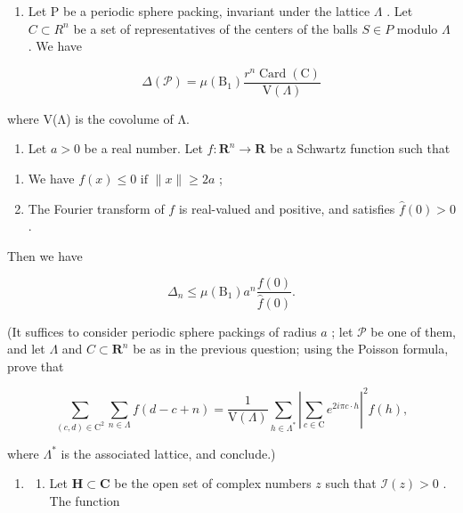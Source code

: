\begin{enumerate}
\def\labelenumi{\alph{enumi})}
\setcounter{enumi}{1}
\tightlist
\item
  Let P be a periodic sphere packing, invariant under the lattice \(\Lambda\) . Let \(C \subset R^{n}\) be a set of representatives of the centers of the balls \(S \in P\) modulo \(\Lambda\) . We have
\end{enumerate}

\[
\Delta (\mathcal {P}) = \mu (\mathrm{B} _ {1}) \frac {r ^ {n} \operatorname{Card} (\mathrm{C})}{\mathrm{V} (\Lambda)}
\]

where V(Λ) is the covolume of Λ.

\begin{enumerate}
\def\labelenumi{\alph{enumi})}
\setcounter{enumi}{2}
\tightlist
\item
  Let \(a > 0\) be a real number. Let \(f: \mathbf{R}^{n} \to \mathbf{R}\) be a Schwartz function such that
\end{enumerate}

\begin{enumerate}
\def\labelenumi{(\roman{enumi})}
\item
  We have \(f(x) \leqslant 0 \text{ if } \|x\| \geqslant 2a\) ;
\item
  The Fourier transform of \(f\) is real-valued and positive, and satisfies \(\widehat{f}(0)>0\) .
\end{enumerate}

Then we have

\[
\Delta_ {n} \leqslant \mu (\mathrm{B} _ {1}) a ^ {n} \frac {f (0)}{\widehat {f} (0)}.
\]

(It suffices to consider periodic sphere packings of radius \(a\) ; let \(\mathcal{P}\) be one of them, and let \(\Lambda\) and \(C \subset \mathbf{R}^n\) be as in the previous question; using the Poisson formula, prove that

\[
\sum_ {(c, d) \in \mathrm{C} ^ {2}} \sum_ {n \in \Lambda} f (d - c + n) = \frac {1}{\mathrm{V} (\Lambda)} \sum_ {h \in \Lambda^ {*}} \left| \sum_ {c \in \mathrm{C}} e ^ {2 i \pi c \cdot h} \right| ^ {2} \widehat {f} (h),
\]

where \(\Lambda^{*}\) is the associated lattice, and conclude.)

\begin{enumerate}
\def\labelenumi{\arabic{enumi})}
\setcounter{enumi}{59}
\tightlist
\item
  \begin{enumerate}
  \def\labelenumii{\alph{enumii})}
  \tightlist
  \item
    Let \(\mathbf{H} \subset \mathbf{C}\) be the open set of complex numbers \(z\) such that \(\mathcal{I}(z) > 0\) . The function
  \end{enumerate}
\end{enumerate}

